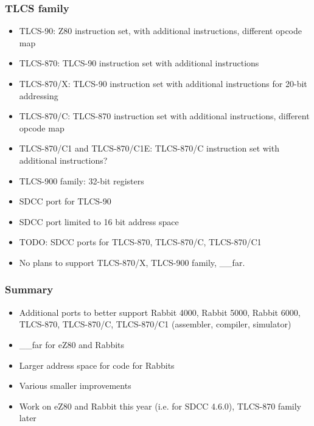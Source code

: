\documentclass[xcolor=dvipsnames]{beamer}
\begin{document}
\begin{frame}
	\frametitle{TLCS family}
	\begin{itemize}
		\item TLCS-90: Z80 instruction set, with additional instructions, different opcode map
		\item TLCS-870: TLCS-90 instruction set with additional instructions
		\item TLCS-870/X: TLCS-90 instruction set with additional instructions for 20-bit addressing
		\item TLCS-870/C: TLCS-870 instruction set with additional instructions, different opcode map
		\item TLCS-870/C1 and TLCS-870/C1E: TLCS-870/C instruction set with additional instructions?
		\item TLCS-900 family: 32-bit registers
		\item SDCC port for TLCS-90
		\item SDCC port limited to 16 bit address space
		\item TODO: SDCC ports for TLCS-870, TLCS-870/C, TLCS-870/C1
		\item No plans to support TLCS-870/X, TLCS-900 family, \_\_far.
	\end{itemize}
\end{frame}

\begin{frame}
	\frametitle{Summary}
	\begin{itemize}
		\item Additional ports to better support Rabbit 4000, Rabbit 5000, Rabbit 6000, TLCS-870, TLCS-870/C, TLCS-870/C1 (assembler, compiler, simulator)
		\item \_\_far for eZ80 and Rabbits
		\item Larger address space for code for Rabbits
		\item Various smaller improvements
		\item Work on eZ80 and Rabbit this year (i.e. for SDCC 4.6.0), TLCS-870 family later
	\end{itemize}
\end{frame}
\end{document}
